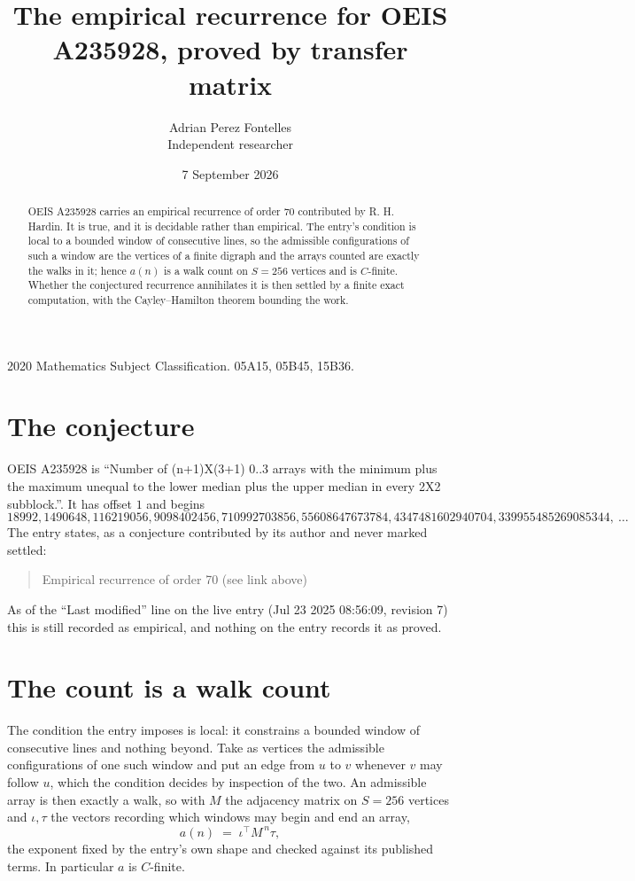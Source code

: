 \documentclass[11pt,a4paper]{article}
\title{The empirical recurrence for OEIS A235928, proved by transfer matrix}
\author{Adrian Perez Fontelles\\ \small Independent researcher}
\date{7 September 2026}
\theoremstyle{plain}
\theoremstyle{definition}
\begin{document}
\maketitle

\begin{abstract}
OEIS A235928 carries an empirical recurrence of order $70$ contributed by R. H. Hardin. It is
true, and it is decidable rather than empirical. The entry's condition is local to a bounded window of consecutive lines, so
the admissible configurations of such a window are the vertices of a finite digraph and the
arrays counted are exactly the walks in it; hence $a(n)$ is a walk count on $S=256$ vertices
and is $C$-finite. Whether the conjectured recurrence annihilates it is then settled by a
finite exact computation, with the Cayley--Hamilton theorem bounding the work.
\end{abstract}

\noindent\small 2020 Mathematics Subject Classification. 05A15, 05B45, 15B36.\normalsize

\section{The conjecture}

OEIS A235928 is ``Number of (n+1)X(3+1) 0..3 arrays with the minimum plus the maximum unequal to the lower median plus the upper median in every 2X2 subblock.''. It has offset $1$ and begins
\[
18992, 1490648, 116219056, 9098402456, 710992703856, 55608647673784, 4347481602940704, 339955485269085344,\ \dots
\]
The entry states, as a conjecture contributed by its author and never marked settled:
\begin{quote}
Empirical recurrence of order 70 (see link above)
\end{quote}
As of the ``Last modified'' line on the live entry (Jul 23 2025 08:56:09, revision 7) this is still
recorded as empirical, and nothing on the entry records it as proved.

\section{The count is a walk count}

The condition the entry imposes is local: it constrains a bounded window of consecutive lines and nothing beyond. Take as
vertices the admissible configurations of one such window and put an edge from $u$ to $v$
whenever $v$ may follow $u$, which the condition decides by inspection of the two. An
admissible array is then exactly a walk, so with $M$ the adjacency matrix on $S=256$ vertices
and $\iota,\tau$ the vectors recording which windows may begin and end an array,
\[
a(n)\;=\;\iota^{\!\top}M^{\,n}\tau ,
\]
the exponent fixed by the entry's own shape and checked against its published terms. In
particular $a$ is $C$-finite.
\end{document}
